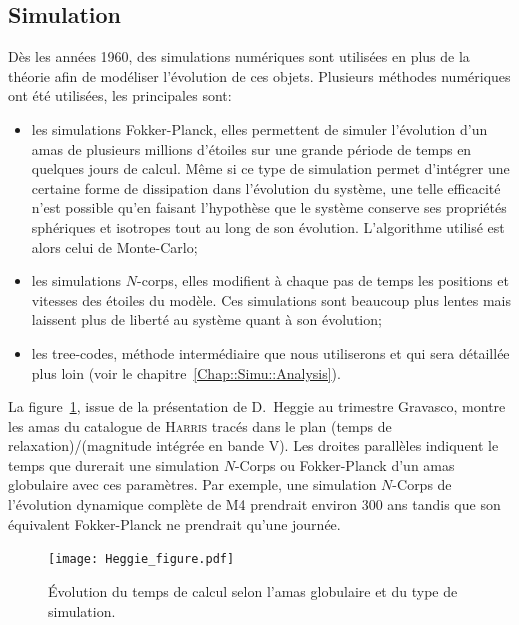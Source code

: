 		\subsection{Simulation}
			Dès les années 1960, des simulations numériques sont utilisées en plus de la
			théorie afin de modéliser l'évolution de ces objets.
			Plusieurs méthodes numériques ont été utilisées, les principales sont:
			\begin{itemize}
					\item les simulations Fokker-Planck, elles permettent de
						simuler l'évolution d'un amas de plusieurs millions
						d'étoiles sur une grande période de temps en quelques
						jours de calcul. Même si ce type de simulation permet d'intégrer une
						certaine forme de dissipation dans l'évolution du système, une telle
						efficacité n'est possible qu'en faisant l'hypothèse que le système
						conserve ses propriétés sphériques et isotropes tout au long de son
						évolution. L'algorithme utilisé est alors celui de Monte-Carlo;
					\item les simulations $N$-corps, elles modifient à chaque pas de
						temps les positions et vitesses des étoiles du
						modèle.
						Ces simulations sont beaucoup plus lentes mais laissent plus de liberté au
						système quant à son évolution;
					\item les tree-codes, méthode intermédiaire que nous utiliserons et qui sera
						détaillée plus loin (voir le chapitre~\ref{Chap::Simu::Analysis}).
			\end{itemize}
			La figure~\ref{Fig::Intro::HeggieFigure}, issue de la présentation de
			D.~Heggie au trimestre Gravasco, montre les amas du catalogue de
			\textsc{Harris} tracés dans le plan (temps de relaxation)/(magnitude intégrée
			en bande V). Les droites parallèles indiquent le
			temps que durerait une simulation $N$-Corps ou Fokker-Planck d'un amas
			globulaire avec ces paramètres. Par exemple, une simulation $N$-Corps de l'évolution dynamique
			complète de M4
			prendrait environ 300 ans tandis que son équivalent Fokker-Planck ne prendrait
			qu'une journée.

			\begin{figure}[h]
				\centering \texttt{[image: Heggie\_figure.pdf]}
				\caption{\label{Fig::Intro::HeggieFigure}Évolution du temps de
				calcul selon l'amas globulaire et du type de simulation.}
			\end{figure}

